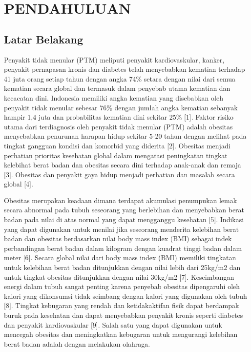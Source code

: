\chapter{PENDAHULUAN}
\label{chap:pendahuluan}


\section{Latar Belakang}
\label{sec:latarbelakang}

Penyakit tidak menular (PTM) meliputi penyakit kardiovaskular, kanker, penyakit pernapasan kronis dan diabetes telah menyebabkan kematian terhadap 41 juta orang setiap tahun dengan angka 74\% setara dengan nilai dari semua kematian secara global dan termasuk dalam penyebab utama kematian dan kecacatan dini. Indonesia memiliki angka kematian yang disebabkan oleh penyakit tidak menular sebesar 76\% dengan jumlah angka kematian sebanyak hampir 1,4 juta dan probabilitas kematian dini sekitar 25\% [1]. Faktor risiko utama dari terdiagnosis oleh penyakit tidak menular (PTM) adalah obesitas menyebabkan penurunan harapan hidup sekitar 5-20 tahun dengan melihat pada tingkat gangguan kondisi dan komorbid yang diderita [2]. Obesitas menjadi perhatian prioritas kesehatan global dalam mengatasi peningkatan tingkat kelebihat berat badan dan obesitas secara dini terhadap anak-anak dan remaja [3]. Obesitas dan penyakit gaya hidup menjadi perhatian dan masalah secara global [4].

Obesitas merupakan keadaan dimana terdapat akumulasi penumpukan lemak secara abnormal pada tubuh seseorang yang berlebihan dan menyebabkan berat badan pada nilai di atas normal yang dapat mengganggu kesehatan [5]. Indikasi yang dapat digunakan untuk menilai jika seseorang menderita kelebihan berat badan dan obesitas berdasarkan nilai body mass index (BMI) sebagai indek perbandingan berat badan dalam kilogram dengan kuadrat tinggi badan dalam meter [6]. Secara global nilai dari body mass index (BMI) memiliki tingkatan untuk kelebihan berat badan ditunjukkan dengan nilai lebih dari 25kg/m2 dan untuk tingkat obesitas ditunjukkan dengan nilai 30kg/m2 [7]. Keseimbangan energi dalam tubuh sangat penting karena penyebab obesitas dipengaruhi oleh kalori yang dikonsumsi tidak seimbang dengan kalori yang digunakan oleh tubuh [8]. Tingkat kebugaran yang rendah dan ketidakaktifan fisik dapat berdampak buruk pada kesehatan dan dapat menyebabkan penyakit kronis seperti diabetes dan penyakit kardiovaskular [9]. Salah satu yang dapat digunakan untuk mencegah obesitas dan meningkatkan kebugaran untuk mengurangi kelebihan berat badan adalah dengan melakukan olahraga.

